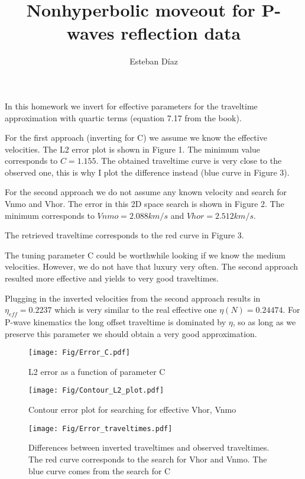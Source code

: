 \documentclass[10pt]{article}
\author{Esteban D\'{i}az}
\title{Nonhyperbolic moveout for P-waves reflection data}{}
\begin{document}
\maketitle

In this homework we invert for effective parameters
for the traveltime approximation with quartic terms (equation 7.17 from 
the book). 

For the first approach (inverting for C) we assume we know the effective
velocities. The L2 error plot is shown in Figure 1. The minimum
value corresponds to $C=1.155$. The obtained traveltime curve is very
close to the observed one, this is why I plot the difference instead
(blue curve in Figure 3). 

For the second approach we do not assume any known velocity and search
for Vnmo and Vhor. The error in this 2D space search is shown in  
Figure 2. The minimum corresponds to $Vnmo=2.088km/s$ and $Vhor=2.512km/s$.

The retrieved traveltime corresponds to the red curve in Figure 3. 

The tuning parameter C could be worthwhile looking if we know
the medium velocities. However, we do not have that luxury very often. 
The second approach resulted more effective and yields to very good 
traveltimes.

Plugging in the inverted velocities from the second approach results
in $\eta_{eff} = 0.2237$ which is very similar to the
real effective one $\eta(N) = 0.24474$. For P-wave kinematics 
the long offset traveltime is dominated by $\eta$, so as long
as we preserve this parameter we should obtain a
 very good approximation.


\begin{figure}
	\begin{center}
		\texttt{[image: Fig/Error\_C.pdf]}
  \end{center}
  \caption{L2 error as a function of parameter C}
\end{figure}

\begin{figure}
	\begin{center}
		\texttt{[image: Fig/Contour\_L2\_plot.pdf]}
  \end{center}
  \caption{Contour error plot for searching for effective Vhor, Vnmo}
\end{figure}

\begin{figure}
	\begin{center}
		\texttt{[image: Fig/Error\_traveltimes.pdf]}
  \end{center}
  \caption{Differences between inverted traveltimes and%
          observed traveltimes. The red curve corresponds to the search%
          for Vhor and Vnmo. The blue curve comes from the search for C}
\end{figure}
\end{document}
